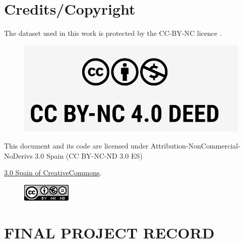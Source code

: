 \setcounter{page}{1}
\pagestyle{plain}

\chapter*{Credits/Copyright}

The dataset used in this work is protected by the CC-BY-NC licence 
\cite{cc_by_nc_license}.

\begin{figure}[ht]
\centering
\includegraphics[scale=1]{images/CC BY-NC license.png}
\end{figure}

\vspace{1cm}

This document and its code are licensed under Attribution-NonCommercial-NoDerivs 3.0 Spain (CC BY-NC-ND 3.0 ES) 

\href{https://creativecommons.org/licenses/by-nc-nd/3.0/es/}{3.0 Spain of CreativeCommons}.


\begin{figure}[ht]
\centering
\includegraphics[scale=1]{images/license.png}
\end{figure}




\chapter*{FINAL PROJECT RECORD}

